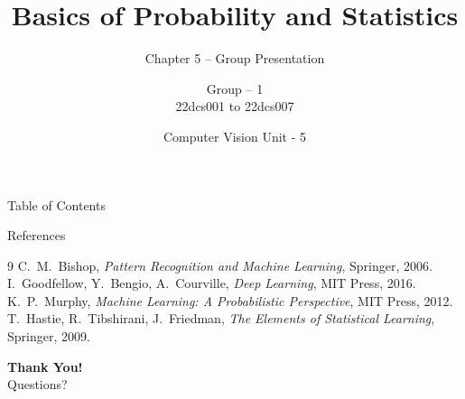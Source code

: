 \documentclass[aspectratio=169]{beamer}
\title{Basics of Probability and Statistics}
\subtitle{Chapter 5 -- Group Presentation}
\author{Group -- 1 \\ 22dcs001 to 22dcs007}
\date{Computer Vision Unit - 5}
\begin{document}
\begin{frame}
\titlepage
\end{frame}

\begin{frame}{Table of Contents}
\tableofcontents
\end{frame}









\begin{frame}{References}
\begin{thebibliography}{9}
 C.~M.~Bishop, \textit{Pattern Recognition and Machine Learning}, Springer, 2006.
 I.~Goodfellow, Y.~Bengio, A.~Courville, \textit{Deep Learning}, MIT Press, 2016.
 K.~P.~Murphy, \textit{Machine Learning: A Probabilistic Perspective}, MIT Press, 2012.
 T.~Hastie, R.~Tibshirani, J.~Friedman, \textit{The Elements of Statistical Learning}, Springer, 2009.
\end{thebibliography}
\end{frame}

\begin{frame}
\centering
\Huge\textbf{Thank You!}\\[12pt]
\Large Questions?
\end{frame}
\end{document}
